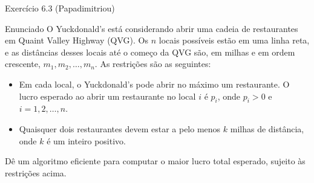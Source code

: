 \documentclass[presentation]{beamer}
\begin{document}
\begin{frame}[label=sec-3]{Exercício 6.3 (Papadimitriou)}

\begin{block}{Enunciado}
O Yuckdonald's está considerando abrir uma cadeia de restaurantes em
Quaint Valley Highway (QVG). Os $n$ locais possíveis estão em uma
linha reta, e as distâncias desses locais até o começo da QVG são, em
milhas e em ordem crescente, $m_1, m_2, \ldots, m_n$. As restrições
são as seguintes:

\begin{itemize}
\item Em cada local, o Yuckdonald's pode abrir no máximo um
restaurante. O lucro esperado ao abrir um restaurante no local
$i$ é $p_i$, onde $p_i > 0$ e $i = 1, 2, \ldots, n$.
\item Quaisquer dois restaurantes devem estar a pelo menos $k$
  milhas de distância, onde $k$ é um inteiro positivo.
\end{itemize}

Dê um algoritmo eficiente para computar o maior lucro total
esperado, sujeito às restrições acima.
\end{block}
\end{frame}
\end{document}
